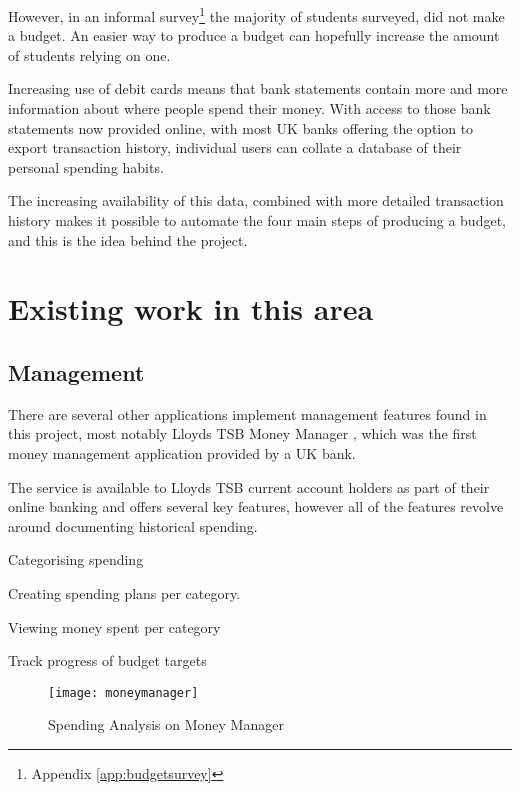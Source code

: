 However, in an informal survey\footnote{Appendix \ref{app:budgetsurvey}} the majority of students surveyed, did not make a budget. An easier way to produce a budget can hopefully increase the amount of students relying on one.

Increasing use of debit cards\cite{bbc2010debit} means that bank statements contain more and more information about where people spend their money. With access to those bank statements now provided online, with most UK banks offering the option to export \gls{transaction} history, individual users can collate a database of their personal spending habits.

The increasing availability of this data, combined with more detailed transaction history makes it possible to automate the four main steps of producing a budget, and this is the idea behind the project.

\section{Existing work in this area}

\subsection{Management}
There are several other applications implement management features found in this project, most notably Lloyds TSB Money Manager \cite{lloyds2014money}, which was the first money management application provided by a UK bank.

The service is available to Lloyds TSB current account holders as part of their online banking and offers several key features, however all of the features revolve around documenting historical spending.

\begin{list}
\item Categorising spending
\item Creating spending plans per category.
\item Viewing money spent per category
\item Track progress of budget targets
\end{list}

\begin{figure}[h]
    \centering
    \texttt{[image: moneymanager]}
    \caption{Spending Analysis on Money Manager \citet{lloyds2014money}}
    \label{fig:moneymanager}
\end{figure}

